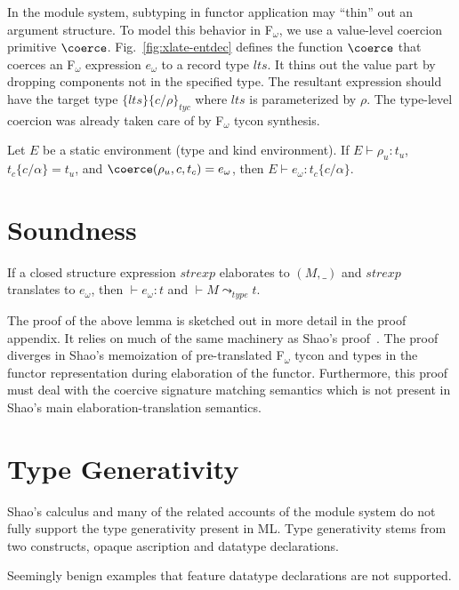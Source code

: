 \documentclass[9pt,nocopyrightspace, fleqn]{sigplanconf}
\begin{document}
In the module system, subtyping in functor application may ``thin''
out an argument structure. To model this behavior in F$_\omega$, we
use a value-level coercion primitive $\coerce$. 
Fig.~\ref{fig:xlate-entdec} defines the function $\coerce$ that
coerces an F$_\omega$ expression $e_\omega$ to a record type $lts$. 
It thins out the value part by dropping components not
in the specified type. The resultant expression should have the target
type $\{lts\}\{c/\rho\}_{tyc}$ where $lts$ is parameterized by
$\rho$. The type-level coercion was already taken care of by
F$_\omega$ tycon synthesis. 

\begin{lemma}
Let $E$ be a static environment (type and kind environment). 
If $E\vdash \rho_u : t_u$, $t_c\{c/\alpha\} = t_u$, and
$\coerce(\rho_u, c, t_c) = e_\omega$, then $E\vdash e_\omega : t_c\{c/\alpha\}$. 
\end{lemma}

\section{Soundness}

\begin{theorem}
If a closed structure expression $strexp$ elaborates to $(M, \_)$ and $strexp$
translates to $e_\omega$, then $\vdash e_\omega : t$ and $\vdash M \leadsto_{type} t$. 
\end{theorem}

The proof of the above lemma is sketched out in more detail in the
proof appendix. It relies on much of the same machinery as Shao's
proof~\cite{shao98}. The proof diverges in Shao's memoization of
pre-translated F$_\omega$ tycon and types in the functor
representation during elaboration of the functor. Furthermore, this
proof must deal with the coercive signature matching semantics which
is not present in Shao's main elaboration-translation semantics. 

\section{Type Generativity}

Shao's calculus and many of the related accounts of the module system
do not fully support the type generativity present in ML. Type
generativity stems from two constructs, opaque ascription and datatype
declarations. 

Seemingly benign examples that feature datatype declarations are not supported. 
\end{document}
